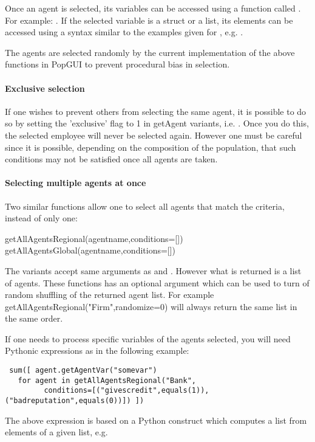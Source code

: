 Once an agent is selected, its variables can be accessed using a function called . For example: . If the selected variable is a struct or a list, its elements can be accessed using a syntax similar to the examples given for , e.g. .

The agents are selected randomly by the current implementation of the above functions in PopGUI to prevent procedural bias in selection.

\paragraph{Exclusive selection}
If one wishes to prevent others from selecting the same agent, it is possible to do so by setting the 'exclusive' flag to 1 in getAgent variants, i.e. . Once you do this, the selected employee will never be selected again. However one must be careful since it is possible, depending on the composition of the population, that such conditions may not be satisfied once all agents are taken.

\paragraph{Selecting multiple agents at once}
Two similar functions allow one to select all agents that match the criteria, instead of only one:
\begin{description}
\item[{getAllAgentsRegional(agentname,conditions=[])}]
\item[{getAllAgentsGlobal(agentname,conditions=[])}]
\end{description}
The variants accept same arguments as  and . However what is returned is a list of agents. These functions has an optional argument which can be used to turn of random shuffling of the returned agent list. For example getAllAgentsRegional("Firm",randomize=0) will always return the same list in the same order.
 

If one needs to process specific variables of the agents selected, you will need Pythonic expressions as in the following example:\\
\begin{verbatim}
 sum([ agent.getAgentVar("somevar") 
   for agent in getAllAgentsRegional("Bank", 
         conditions=[("givescredit",equals(1)),("badreputation",equals(0))]) ])
\end{verbatim}
The above expression is based on a Python construct which computes a list from elements of a given list, e.g. \example{[i*i for i in [1,2,3]]}

